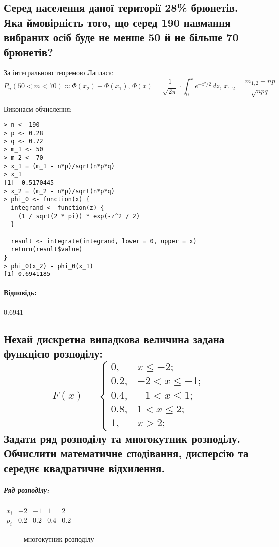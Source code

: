 \documentclass[a4paper, 12pt, oneside]{extarticle}
\newcommand{\Problem}{\subsection}
\newcommand{\Answer}[1]{
\medskip
\null\hfill
\begin{boxedminipage}{\textwidth}
	\paragraph{Відповідь: }{#1}
\end{boxedminipage}
}
\begin{document}
\Problem{ %
	Серед населення даної території 28\% брюнетів. Яка ймовірність того, що серед 190 навмання вибраних осіб буде не менше 50 й не більше 70 брюнетів?
}

За інтегральною теоремою Лапласа:
$$
P_n(50 < m < 70) \approx
\Phi(x_2) -
\Phi(x_1)
,\,
\Phi(x) =
\frac{1}{\sqrt{2\pi}} \cdot \int_0^x e^{-z^2/2}\,dz
,\,
x_{1,2}=\frac{m_{1,2}-np}{\sqrt{npq}}
$$

Виконаєм обчислення:
\begin{verbatim}
> n <- 190
> p <- 0.28
> q <- 0.72
> m_1 <- 50
> m_2 <- 70
> x_1 = (m_1 - n*p)/sqrt(n*p*q)
> x_1
[1] -0.5170445
> x_2 = (m_2 - n*p)/sqrt(n*p*q)
> phi_0 <- function(x) {
  integrand <- function(z) {
    (1 / sqrt(2 * pi)) * exp(-z^2 / 2)
  }

  result <- integrate(integrand, lower = 0, upper = x)
  return(result$value)
}
> phi_0(x_2) - phi_0(x_1)
[1] 0.6941185
\end{verbatim}

\Answer{0.6941}

\Problem{
	Нехай дискретна випадкова величина задана функцією розподілу:
$$
	F(x) =
	\begin{cases}
		0, & x \leq -2 ; \\
		0.2, & -2 < x \leq -1 ; \\
		0.4, & -1 < x \leq 1 ; \\
		0.8, & 1 < x \leq 2 ; \\
		1, & x > 2 ;
	\end{cases}
$$
	Задати ряд розподілу та многокутник розподілу. Обчислити математичне сподівання, дисперсію та середнє квадратичне відхилення.
}

\subparagraph{Ряд розподілу:}
$
\begin{array}{ccccc}
	x_i & -2  & -1  & 1   & 2   \\
	p_i & 0.2 & 0.2 & 0.4 & 0.2
\end{array}
$

\begin{figure}[h]
	\centering
{}
	\caption{многокутник розподілу}
\end{figure}
\end{document}
